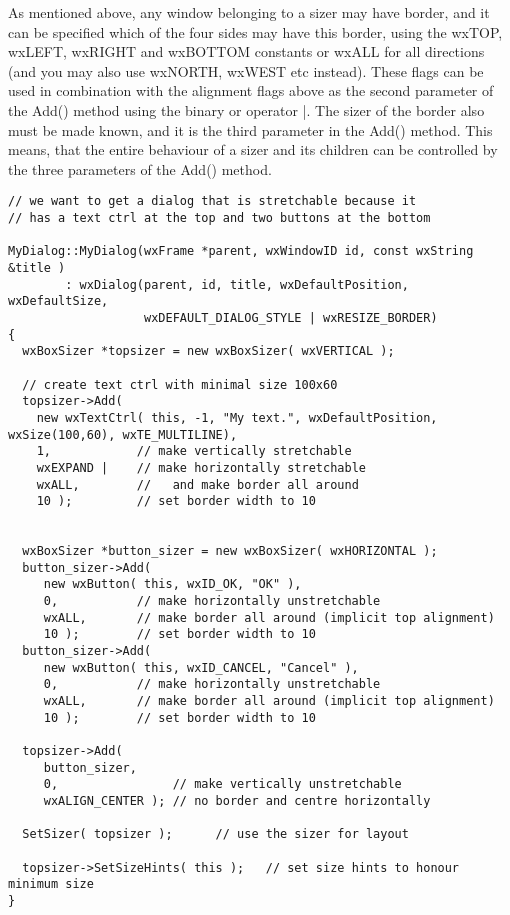 As mentioned above, any window belonging to a sizer may have border, and it can be specified
which of the four sides may have this border, using the wxTOP, wxLEFT, wxRIGHT and wxBOTTOM
constants or wxALL for all directions (and you may also use wxNORTH, wxWEST etc instead). These
flags can be used in combination with the alignment flags above as the second parameter of the
Add() method using the binary or operator |. The sizer of the border also must be made known,
and it is the third parameter in the Add() method. This means, that the entire behaviour of
a sizer and its children can be controlled by the three parameters of the Add() method.

\begin{verbatim}
// we want to get a dialog that is stretchable because it
// has a text ctrl at the top and two buttons at the bottom

MyDialog::MyDialog(wxFrame *parent, wxWindowID id, const wxString &title )
        : wxDialog(parent, id, title, wxDefaultPosition, wxDefaultSize,
                   wxDEFAULT_DIALOG_STYLE | wxRESIZE_BORDER)
{
  wxBoxSizer *topsizer = new wxBoxSizer( wxVERTICAL );

  // create text ctrl with minimal size 100x60
  topsizer->Add(
    new wxTextCtrl( this, -1, "My text.", wxDefaultPosition, wxSize(100,60), wxTE_MULTILINE),
    1,            // make vertically stretchable
    wxEXPAND |    // make horizontally stretchable
    wxALL,        //   and make border all around
    10 );         // set border width to 10


  wxBoxSizer *button_sizer = new wxBoxSizer( wxHORIZONTAL );
  button_sizer->Add(
     new wxButton( this, wxID_OK, "OK" ),
     0,           // make horizontally unstretchable
     wxALL,       // make border all around (implicit top alignment)
     10 );        // set border width to 10
  button_sizer->Add(
     new wxButton( this, wxID_CANCEL, "Cancel" ),
     0,           // make horizontally unstretchable
     wxALL,       // make border all around (implicit top alignment)
     10 );        // set border width to 10

  topsizer->Add(
     button_sizer,
     0,                // make vertically unstretchable
     wxALIGN_CENTER ); // no border and centre horizontally

  SetSizer( topsizer );      // use the sizer for layout

  topsizer->SetSizeHints( this );   // set size hints to honour minimum size
}
\end{verbatim}

